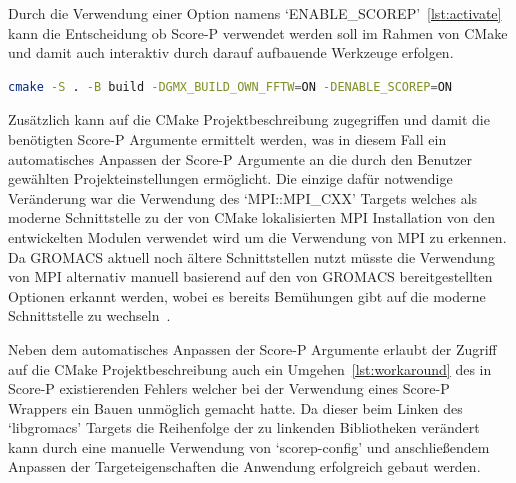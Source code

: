 \documentclass[german,proseminar,hyperref,utf8]{zihpub}
\begin{document}
    Durch die Verwendung einer Option namens `ENABLE\_SCOREP'~\ref{lst:activate} kann die Entscheidung ob
    Score-P verwendet werden soll im Rahmen von CMake und damit auch interaktiv durch darauf aufbauende
    Werkzeuge erfolgen.

    \begin{lstlisting}[caption=Aktivieren von Score-P bei GROMACS, language=bash, gobble=8, label=lst:activate]
        cmake -S . -B build -DGMX_BUILD_OWN_FFTW=ON -DENABLE_SCOREP=ON
    \end{lstlisting}

    Zusätzlich kann auf die CMake Projektbeschreibung zugegriffen und damit die benötigten Score-P Argumente
    ermittelt werden, was in diesem Fall ein automatisches Anpassen der Score-P Argumente an die
    durch den Benutzer gewählten Projekteinstellungen ermöglicht.
    Die einzige dafür notwendige Veränderung war die Verwendung des `MPI::MPI\_CXX' Targets welches
    als moderne Schnittstelle zu der von CMake lokalisierten MPI Installation von den entwickelten
    Modulen verwendet wird um die Verwendung von MPI zu erkennen.
    Da GROMACS aktuell noch ältere Schnittstellen nutzt müsste die Verwendung von MPI alternativ
    manuell basierend auf den von GROMACS bereitgestellten Optionen erkannt werden, wobei es bereits
    Bemühungen gibt auf die moderne Schnittstelle zu wechseln~.

    Neben dem automatisches Anpassen der Score-P Argumente erlaubt der Zugriff auf die CMake
    Projektbeschreibung auch ein Umgehen~\ref{lst:workaround} des in Score-P existierenden Fehlers
    welcher bei der Verwendung eines Score-P Wrappers ein Bauen unmöglich gemacht hatte.
    Da dieser beim Linken des `libgromacs' Targets die Reihenfolge der zu linkenden Bibliotheken
    verändert kann durch eine manuelle Verwendung von `scorep-config' und anschlie{\ss}endem Anpassen
    der Targeteigenschaften die Anwendung erfolgreich gebaut werden.
\end{document}
